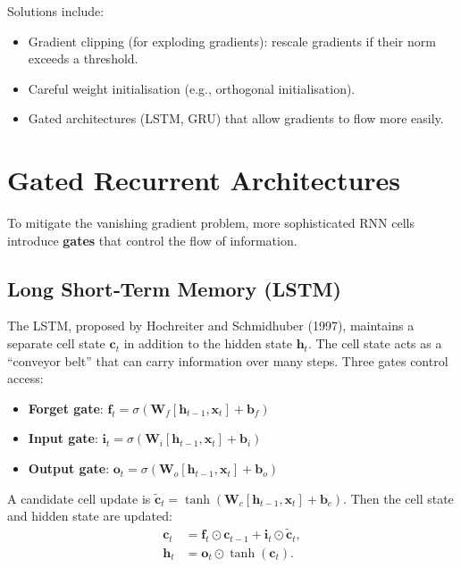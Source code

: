 \documentclass{tufte-handout}
\begin{document}
Solutions include:
\begin{itemize}
    \item Gradient clipping (for exploding gradients): rescale gradients if their norm exceeds a threshold.
    \item Careful weight initialisation (e.g., orthogonal initialisation).
    \item Gated architectures (LSTM, GRU) that allow gradients to flow more easily.
\end{itemize}

\section{Gated Recurrent Architectures}

To mitigate the vanishing gradient problem, more sophisticated RNN cells introduce \textbf{gates} that control the flow of information.

\subsection{Long Short‑Term Memory (LSTM)}

The LSTM, proposed by Hochreiter and Schmidhuber (1997), maintains a separate cell state $\mathbf{c}_t$ in addition to the hidden state $\mathbf{h}_t$. The cell state acts as a “conveyor belt” that can carry information over many steps. Three gates control access:

\begin{itemize}
    \item \textbf{Forget gate}: $\mathbf{f}_t = \sigma(\mathbf{W}_f [\mathbf{h}_{t-1}, \mathbf{x}_t] + \mathbf{b}_f)$
    \item \textbf{Input gate}: $\mathbf{i}_t = \sigma(\mathbf{W}_i [\mathbf{h}_{t-1}, \mathbf{x}_t] + \mathbf{b}_i)$
    \item \textbf{Output gate}: $\mathbf{o}_t = \sigma(\mathbf{W}_o [\mathbf{h}_{t-1}, \mathbf{x}_t] + \mathbf{b}_o)$
\end{itemize}

A candidate cell update is $\tilde{\mathbf{c}}_t = \tanh(\mathbf{W}_c [\mathbf{h}_{t-1}, \mathbf{x}_t] + \mathbf{b}_c)$. Then the cell state and hidden state are updated:
\begin{align}
    \mathbf{c}_t &= \mathbf{f}_t \odot \mathbf{c}_{t-1} + \mathbf{i}_t \odot \tilde{\mathbf{c}}_t, \\
    \mathbf{h}_t &= \mathbf{o}_t \odot \tanh(\mathbf{c}_t).
\end{align}
\end{document}

